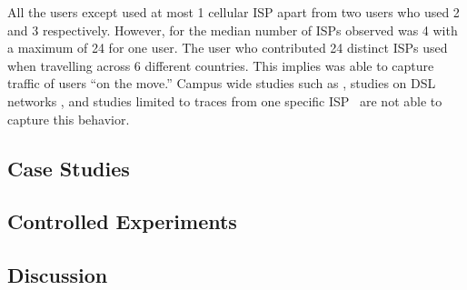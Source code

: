 All the users except used at most 1 cellular ISP apart from two users who used 2 and 3 respectively.
However, for \wifi the median number of ISPs observed was 4 with a maximum of 24 for one user. 
The user who contributed 24 distinct ISPs used \platname when travelling across 6 different countries. 
This implies \platname was able to capture traffic of users ``on the move.''
Campus wide studies such as \tbd{}, studies on DSL networks \cite{maier:mobtraffic}, and studies limited to traces from one specific ISP~\cite{vallina-rod:ads} are not able to capture this behavior.



\subsection{Case Studies}


\subsection{Controlled Experiments}

\subsection{Discussion}





